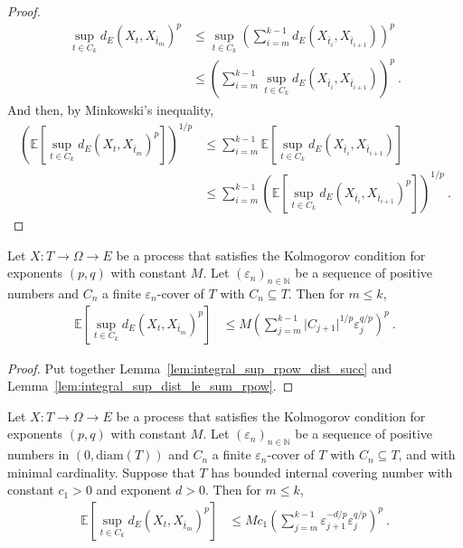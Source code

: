 \begin{proof}
\begin{align*}
  \sup_{t \in C_k} d_E(X_t, X_{\bar{t}_m})^p
  &\le \sup_{t \in C_k} \left( \sum_{i=m}^{k-1} d_E(X_{\bar{t}_i}, X_{\bar{t}_{i+1}}) \right)^p
  \\
  &\le \left( \sum_{i=m}^{k-1} \sup_{t \in C_k} d_E(X_{\bar{t}_i}, X_{\bar{t}_{i+1}}) \right)^p
  \: .
\end{align*}
And then, by Minkowski's inequality,
\begin{align*}
  \left(\mathbb{E} \left[\sup_{t \in C_k} d_E(X_t, X_{\bar{t}_m})^p \right]\right)^{1/p}
  &\le \sum_{i=m}^{k-1} \mathbb{E} \left[\sup_{t \in C_k} d_E(X_{\bar{t}_i}, X_{\bar{t}_{i+1}}) \right]
  \\
  &\le \sum_{i=m}^{k-1} \left( \mathbb{E}\left[\sup_{t \in C_k} d_E(X_{\bar{t}_i}, X_{\bar{t}_{i+1}})^p \right] \right)^{1/p}
  \: .
\end{align*}
\end{proof}


\begin{lemma}\label{lem:integral_sup_rpow_dist_le_sum}
  \leanok
Let $X : T \to \Omega \to E$ be a process that satisfies the Kolmogorov condition for exponents $(p,q)$ with constant $M$.
Let $(\varepsilon_n)_{n \in \mathbb{N}}$ be a sequence of positive numbers and $C_n$ a finite $\varepsilon_n$-cover of $T$ with $C_n \subseteq T$.
Then for $m \le k$,
\begin{align*}
  \mathbb{E} \left[\sup_{t \in C_k} d_E(X_t, X_{\bar{t}_m})^p \right]
  &\le M \left( \sum_{j=m}^{k-1} \vert C_{j+1} \vert^{1/p} \varepsilon_j^{q/p} \right)^p
  \: .
\end{align*}
\end{lemma}

\begin{proof}
Put together Lemma~\ref{lem:integral_sup_rpow_dist_succ} and Lemma~\ref{lem:integral_sup_dist_le_sum_rpow}.
\end{proof}


\begin{lemma}\label{lem:integral_sup_rpow_dist_le_of_minimal_cover}
  \leanok
Let $X : T \to \Omega \to E$ be a process that satisfies the Kolmogorov condition for exponents $(p,q)$ with constant $M$.
Let $(\varepsilon_n)_{n \in \mathbb{N}}$ be a sequence of positive numbers in $(0, \mathrm{diam}(T))$ and $C_n$ a finite $\varepsilon_n$-cover of $T$ with $C_n \subseteq T$, and with minimal cardinality.
Suppose that $T$ has bounded internal covering number with constant $c_1>0$ and exponent $d > 0$.
Then for $m \le k$,
\begin{align*}
  \mathbb{E} \left[\sup_{t \in C_k} d_E(X_t, X_{\bar{t}_m})^p \right]
  &\le M c_1 \left( \sum_{j=m}^{k-1} \varepsilon_{j+1}^{-d/p} \varepsilon_j^{q/p} \right)^p
  \: .
\end{align*}
\end{lemma}

